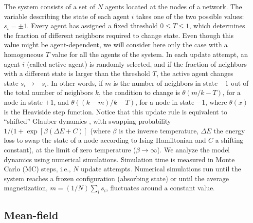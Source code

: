 	The system consists of a set of $N$ agents located at the nodes of a network. The variable describing the state of each agent $i$ takes one of the two possible values: $s_i = \pm 1$. Every agent has assigned a fixed threshold $0 \leq T \leq 1$, which determines the fraction of different neighbors required to change state. Even though this value might be agent-dependent, we will consider here only the case with a homogeneous $T$ value for all the agents of the system. In each update attempt, an agent $i$ (called active agent) is randomly selected, and if the fraction of neighbors with a different state is larger than the threshold $T$, the active agent changes state $s_i \to -s_i$. In other words, if $m$ is the number of neighbors in state $-1$ out of the total number of neighbors $k$, the condition to change is $\theta(m/k - T)$, for a node in state $+1$, and $\theta((k-m)/k - T)$, for a node in state $-1$, where $\theta(x)$ is the Heaviside step function. Notice that this update rule is equivalent to ``shifted'' Glauber dynamics \cite{glauber1963time}, with swapping probability $1/(1+\exp[\beta(\Delta E + C)]$ (where $\beta$ is the inverse temperature, $\Delta E$ the energy loss to swap the state of a node according to Ising Hamiltonian and $C$ a shifting constant), at the limit of zero temperature ($\beta \to \infty$). We analyze the model dynamics using numerical simulations. Simulation time is measured in Monte Carlo (MC) steps, i.e., $N$ update attempts. Numerical simulations run until the system reaches a frozen configuration (absorbing state) or until the average magnetization, $m = (1/N) \sum_i s_i$, fluctuates around a constant value.
	
	\subsection{Mean-field}
	
